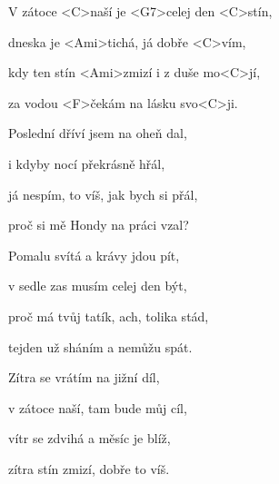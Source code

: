 

\zs
V zátoce <C>naší je <G7>celej den <C>stín,

dneska je <Ami>tichá, já dobře <C>vím,

kdy ten stín <Ami>zmizí i z duše mo<C>jí,

za vodou <F>čekám na lásku svo<C>ji.
\ks

\zs
Poslední dříví jsem na oheň dal,

i kdyby nocí překrásně hřál,

já nespím, to víš, jak bych si přál,

proč si mě Hondy na práci vzal?
\ks

\zs
Pomalu svítá a krávy jdou pít,

v sedle zas musím celej den být,

proč má tvůj tatík, ach, tolika stád,

tejden už sháním a nemůžu spát.
\ks

\zs
Zítra se vrátím na jižní díl,

v zátoce naší, tam bude můj cíl,

vítr se zdvihá a měsíc je blíž,

zítra stín zmizí, dobře to víš.
\ks

\kp























